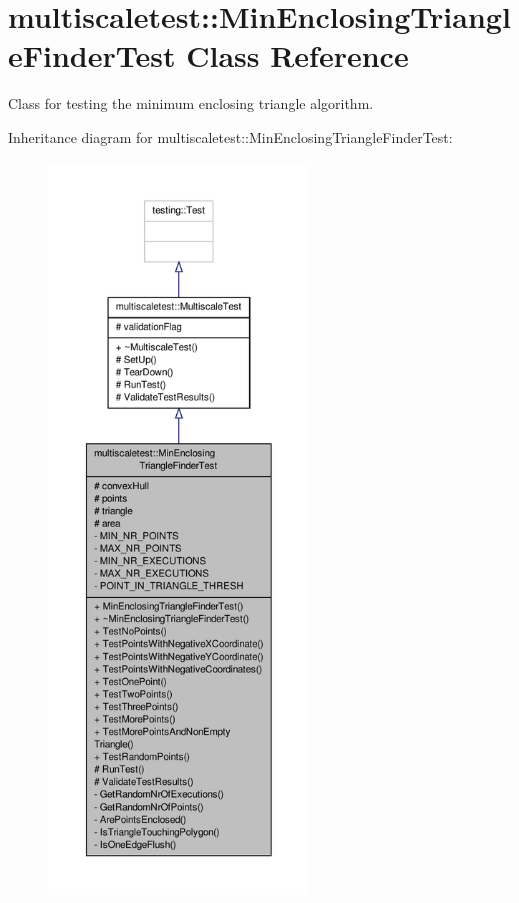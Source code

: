 \hypertarget{classmultiscaletest_1_1MinEnclosingTriangleFinderTest}{\section{multiscaletest\-:\-:Min\-Enclosing\-Triangle\-Finder\-Test Class Reference}
\label{classmultiscaletest_1_1MinEnclosingTriangleFinderTest}
}


Class for testing the minimum enclosing triangle algorithm.  




Inheritance diagram for multiscaletest\-:\-:Min\-Enclosing\-Triangle\-Finder\-Test\-:
\nopagebreak
\begin{figure}[H]
\begin{center}
\leavevmode
\includegraphics[height=550pt]{classmultiscaletest_1_1MinEnclosingTriangleFinderTest__inherit__graph}
\end{center}
\end{figure}


